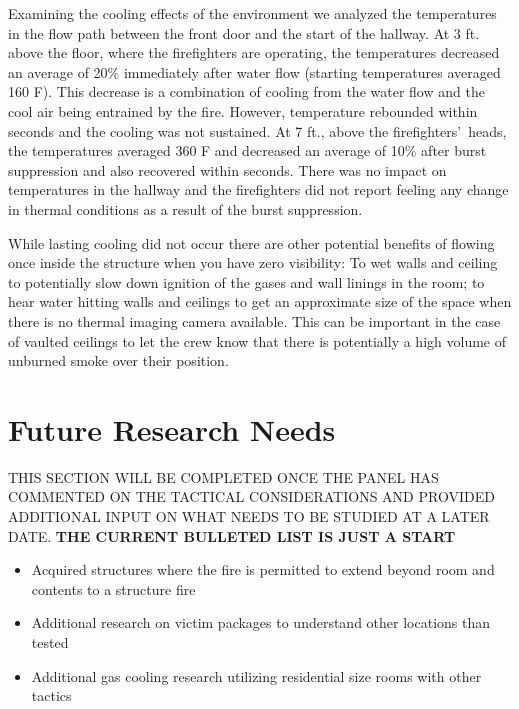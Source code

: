 \documentclass[12pt,oneside]{book}
\begin{document}
Examining the cooling effects of the environment we analyzed the temperatures in the flow path between the front door and the start of the hallway.  At 3 ft. above the floor, where the firefighters are operating, the temperatures decreased an average of 20\% immediately after water flow (starting temperatures averaged 160 \textdegree F).  This decrease is a combination of cooling from the water flow and the cool air being entrained by the fire.  However, temperature rebounded within seconds and the cooling was not sustained.  At 7 ft., above the firefighters\textquoteright \ heads, the temperatures averaged 360 \textdegree F and decreased an average of 10\% after burst suppression and also recovered within seconds.  There was no impact on temperatures in the hallway and the firefighters did not report feeling any change in thermal conditions as a result of the burst suppression.  

While lasting cooling did not occur there are other potential benefits of flowing once inside the structure when you have zero visibility:  To wet walls and ceiling to potentially slow down ignition of the gases and wall linings in the room; to hear water hitting walls and ceilings to get an approximate size of the space when there is no thermal imaging camera available.    This can be important in the case of vaulted ceilings to let the crew know that there is potentially a high volume of unburned smoke over their position. 

\chapter{Future Research Needs}

THIS SECTION WILL BE COMPLETED ONCE THE PANEL HAS COMMENTED ON THE TACTICAL CONSIDERATIONS AND PROVIDED ADDITIONAL INPUT ON WHAT NEEDS TO BE STUDIED AT A LATER DATE. \bf{THE CURRENT BULLETED LIST IS JUST A START}

\normalfont

\begin{itemize}
	\item{Acquired structures where the fire is permitted to extend beyond room and contents to a structure fire}
	\item{Additional research on victim packages to understand other locations than tested}
	\item{Additional gas cooling research utilizing residential size rooms with other tactics}
\end{itemize}
\end{document}
